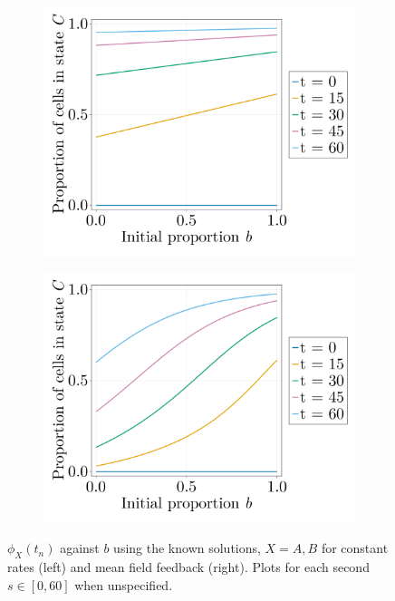\begin{figure}[ht]
\begin{subfigure}{0.4\textwidth}
    \end{subfigure}
    \\
    \begin{subfigure}{0.4\textwidth}
        \centering
        \includegraphics[width=\textwidth]{figures/407/407-phic-vs-b-solution-constant.png}
    \end{subfigure}
    \hspace{5em}
    \begin{subfigure}{0.4\textwidth}
        \centering
        \includegraphics[width=\textwidth]{figures/407/407-phic-vs-b-solution-meanfield.png}
    \end{subfigure}
    \caption{$\phi_X(t_n)$ against $b$ using the known solutions, $X=A,B$ for constant rates (left) and mean field feedback (right). Plots for each second $s\in[0,60]$ when unspecified.}
    \label{fig:phix-solutions}
\end{figure}